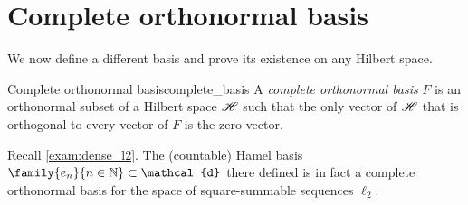 \section{Complete orthonormal basis}
We now define a different basis and prove its existence on any Hilbert space.
\begin{definition}{Complete orthonormal basis}{complete_basis}
    A \emph{complete orthonormal basis} \(F\) is an orthonormal subset of a Hilbert space \(\mathscr{H}\) such that the only vector of \(\mathscr{H}\) that is orthogonal to every vector of \(F\) is the zero vector.
\end{definition}
\begin{remark}
    Recall \cref{exam:dense_l2}. The (countable) Hamel basis \(\family{e_n}{n \in \mathbb{N}} \subset \mathcal{d}\) there defined is in fact a complete orthonormal basis for the space of square-summable sequences \(\ell_2\).
\end{remark}

